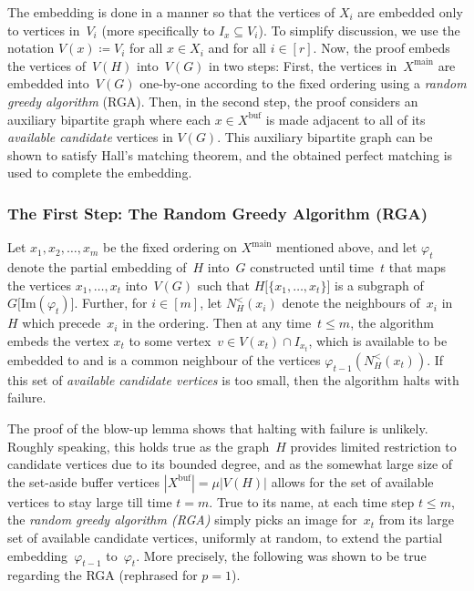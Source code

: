 \documentclass[final]{article}
\def\mcite[#1]#2{\mbox{\cite[#1]{#2}}}
\theoremstyle{definition}
\newcommand{\main}{\mathrm{main}}
\newcommand{\buf}{\mathrm{buf}}
\newcommand{\im}{\mathrm{Im}}
\begin{document}
The embedding is done in a manner so that the vertices of $X_i$ are embedded only to vertices in~$V_i$ (more specifically to $I_x \subseteq V_i$). To simplify discussion, we use the notation $V(x) \coloneqq V_i$ for all $x \in X_i$ and for all $i \in [r]$.
Now, the proof embeds the vertices of~$V(H)$ into~$V(G)$ in two steps: First, the vertices in~$X^{\main}$ are embedded into~$V(G)$ one-by-one according to the fixed ordering using a \emph{random greedy algorithm} (RGA). Then, in the second step, the proof considers an auxiliary bipartite graph where each $x \in X^{\buf}$ is made adjacent to all of its \emph{available candidate} vertices in $V(G)$. This auxiliary bipartite graph can be shown to satisfy Hall's matching theorem, and the obtained perfect matching is used to complete the embedding. 

\subsubsection*{The First Step: The Random Greedy Algorithm (RGA)} 

Let $x_1, x_2, \dots, x_m$ be the fixed ordering on $X^{\main}$ mentioned above, and let $\varphi_t$ denote the partial embedding of~$H$ into~$G$ constructed until time~$t$ that maps the vertices $x_1, \dots, x_t$ into~$V(G)$ such that $H\bigl[\{x_1, \dots, x_t\}\bigr]$ is a subgraph of $G\bigl[\im(\varphi_t)\bigr]$. 
Further, for $i \in [m]$, let $N^{<}_H(x_i)$ denote the neighbours of~$x_i$ in~$H$ which precede~$x_i$ in the ordering. 
Then at any time~$t \leq m$, the algorithm embeds the vertex $x_t$ to some vertex~$v \in V(x_t) \cap I_{x_t}$, which is available to be embedded to and is a common neighbour of the vertices $\varphi_{t-1}(N_H^{<}(x_t))$. If this set of \emph{available candidate vertices} is too small, then the algorithm halts with failure. 

The proof of the blow-up lemma shows that halting with failure is unlikely. Roughly speaking, this holds true as the graph~$H$ provides limited restriction to candidate vertices due to its bounded degree, and as the somewhat large size of the set-aside buffer vertices $|X^{\buf}| = \mu|V(H)|$ allows for the set of available vertices to stay large till time $t = m$. True to its name, at each time step $t \leq m$, the \emph{random greedy algorithm (RGA)} simply picks an image for~$x_t$ from its large set of available candidate vertices, uniformly at random, to extend the partial embedding~$\varphi_{t-1}$ to~$\varphi_t$. More precisely, the following was shown to be true regarding the RGA \mcite[Claim 4.4]{sparse_blowup} (rephrased for $p=1$).
    
\end{document}
